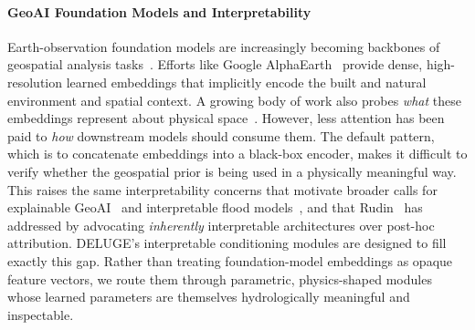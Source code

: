 \paragraph{GeoAI Foundation Models and Interpretability}
Earth-observation foundation models are increasingly becoming backbones of geospatial analysis tasks~\cite{agarwal2024general,szwarcman2024geospatial,zhu_foundations_2026}.
%
Efforts like Google AlphaEarth~\cite{brown_alphaearth_2025} provide dense, high-resolution learned embeddings that implicitly encode the built and natural environment and spatial context.
%
A growing body of work also probes \emph{what} these embeddings represent about physical space~\cite{benavides2026earth,rahman_physically_2026,bell_earth_2026}.
%
However, less attention has been paid to \emph{how} downstream models should consume them.
%
The default pattern, which is to concatenate embeddings into a black-box encoder, makes it difficult to verify whether the geospatial prior is being used in a physically meaningful way.
%
This raises the same interpretability concerns that motivate broader calls for explainable GeoAI~\cite{hsu_explainable_2023,roussel2025introducing,suri_trusting_nodate,zhu_foundations_2026} and interpretable flood models~\cite{taghizadeh_interpretable_2024}, and that Rudin~\cite{rudin_stop_2019} has addressed by advocating \emph{inherently} interpretable architectures over post-hoc attribution.
%
DELUGE's interpretable conditioning modules are designed to fill exactly this gap.
%
Rather than treating foundation-model embeddings as opaque feature vectors, we route them through parametric, physics-shaped modules whose learned parameters are themselves hydrologically meaningful and inspectable.

